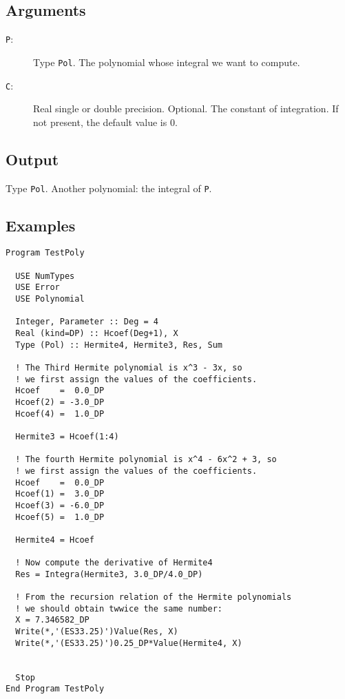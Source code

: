 \subsection{Arguments}

\begin{description}
\item[\texttt{P}:] Type \texttt{Pol}. The polynomial whose integral
  we want to compute.
\item[\texttt{C}:] Real single or double precision. Optional. The
  constant of integration. If not present, the default value is 0.
\end{description}

\subsection{Output}

Type \texttt{Pol}. Another polynomial: the integral of \texttt{P}.

\subsection{Examples}

\begin{verbatim}
Program TestPoly

  USE NumTypes
  USE Error
  USE Polynomial

  Integer, Parameter :: Deg = 4
  Real (kind=DP) :: Hcoef(Deg+1), X
  Type (Pol) :: Hermite4, Hermite3, Res, Sum

  ! The Third Hermite polynomial is x^3 - 3x, so
  ! we first assign the values of the coefficients.
  Hcoef    =  0.0_DP
  Hcoef(2) = -3.0_DP
  Hcoef(4) =  1.0_DP

  Hermite3 = Hcoef(1:4)

  ! The fourth Hermite polynomial is x^4 - 6x^2 + 3, so
  ! we first assign the values of the coefficients.
  Hcoef    =  0.0_DP
  Hcoef(1) =  3.0_DP
  Hcoef(3) = -6.0_DP
  Hcoef(5) =  1.0_DP

  Hermite4 = Hcoef

  ! Now compute the derivative of Hermite4
  Res = Integra(Hermite3, 3.0_DP/4.0_DP)

  ! From the recursion relation of the Hermite polynomials 
  ! we should obtain twwice the same number:
  X = 7.346582_DP
  Write(*,'(ES33.25)')Value(Res, X)
  Write(*,'(ES33.25)')0.25_DP*Value(Hermite4, X)
  

  Stop
End Program TestPoly
\end{verbatim}

